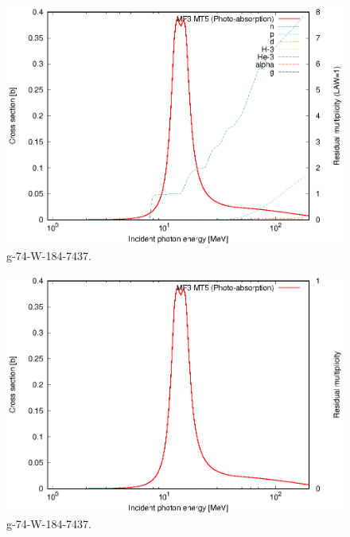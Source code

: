 \begin{figure}
 \includegraphics[width=\linewidth]{eps/g_74-W-184_7437.eps}
  \caption{g-74-W-184-7437.}
\end{figure}
\begin{figure}
 \includegraphics[width=\linewidth]{eps-law0/g_74-W-184_7437.eps}
 \caption{g-74-W-184-7437.}
\end{figure}
\newpage \clearpage

